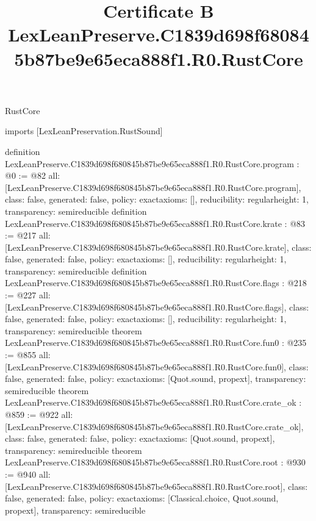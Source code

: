 \begin{lexlean}{RustCore}
\title{Certificate B LexLeanPreserve.C1839d698f680845b87be9e65eca888f1.R0.RustCore}
\begin{coremodule}
imports [LexLeanPreservation.RustSound]

definition LexLeanPreserve.C1839d698f680845b87be9e65eca888f1.R0.RustCore.program : @0 := @82 {
  all: [LexLeanPreserve.C1839d698f680845b87be9e65eca888f1.R0.RustCore.program],
  class: false,
  generated: false,
  policy: exact{axioms: []},
  reducibility: regular{height: 1},
  transparency: semireducible
}
definition LexLeanPreserve.C1839d698f680845b87be9e65eca888f1.R0.RustCore.krate : @83 := @217 {
  all: [LexLeanPreserve.C1839d698f680845b87be9e65eca888f1.R0.RustCore.krate],
  class: false,
  generated: false,
  policy: exact{axioms: []},
  reducibility: regular{height: 1},
  transparency: semireducible
}
definition LexLeanPreserve.C1839d698f680845b87be9e65eca888f1.R0.RustCore.flags : @218 := @227 {
  all: [LexLeanPreserve.C1839d698f680845b87be9e65eca888f1.R0.RustCore.flags],
  class: false,
  generated: false,
  policy: exact{axioms: []},
  reducibility: regular{height: 1},
  transparency: semireducible
}
theorem LexLeanPreserve.C1839d698f680845b87be9e65eca888f1.R0.RustCore.fun0 : @235 := @855 {
  all: [LexLeanPreserve.C1839d698f680845b87be9e65eca888f1.R0.RustCore.fun0],
  class: false,
  generated: false,
  policy: exact{axioms: [Quot.sound, propext]},
  transparency: semireducible
}
theorem LexLeanPreserve.C1839d698f680845b87be9e65eca888f1.R0.RustCore.crate_ok : @859 := @922 {
  all: [LexLeanPreserve.C1839d698f680845b87be9e65eca888f1.R0.RustCore.crate_ok],
  class: false,
  generated: false,
  policy: exact{axioms: [Quot.sound, propext]},
  transparency: semireducible
}
theorem LexLeanPreserve.C1839d698f680845b87be9e65eca888f1.R0.RustCore.root : @930 := @940 {
  all: [LexLeanPreserve.C1839d698f680845b87be9e65eca888f1.R0.RustCore.root],
  class: false,
  generated: false,
  policy: exact{axioms: [Classical.choice, Quot.sound, propext]},
  transparency: semireducible
}


\end{coremodule}
\end{lexlean}

